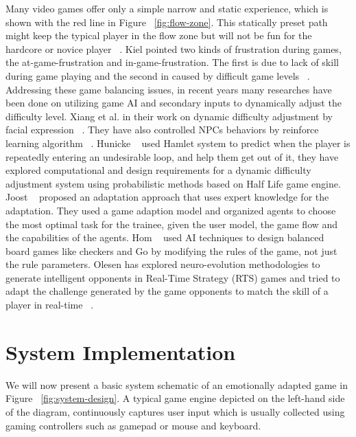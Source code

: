 \documentclass[conference]{IEEEtran}
\begin{document}
Many video games offer only a simple narrow and static experience, which is shown with the red line in Figure ~\ref{fig:flow-zone}. This statically preset path might keep the typical player in the flow zone but will not be fun for the hardcore or novice player ~\cite{chen2007flow}. Kiel pointed two kinds of frustration during games, the at-game-frustration and in-game-frustration. The first is due to lack of skill during game playing and the second in caused by difficult game levels ~\cite{gilleade2004using}. Addressing these game balancing issues, in recent years many researches have been done on utilizing game AI and secondary inputs to dynamically adjust the difficulty level. Xiang et al. in their work on dynamic difficulty adjustment by facial expression ~\cite{xiang2013dynamic}. They have also controlled NPCs behaviors by reinforce learning algorithm ~\cite{spronck2004difficulty, andrade2005challenge}. Hunicke ~\cite{hunicke2004ai} used Hamlet system to predict when the player is repeatedly entering an undesirable loop, and help them get out of it, they have explored computational and design requirements for a dynamic difficulty adjustment system using probabilistic methods based on Half Life game engine. Joost ~\cite{westra2009adaptive} proposed an adaptation approach that uses expert knowledge for the adaptation. They used a game adaption model and organized agents to choose the most optimal task for the trainee, given the user model, the game flow and the capabilities of the agents. Hom ~\cite{hom2007automatic} used AI techniques to design balanced board games like checkers and Go by modifying the rules of the game, not just the rule parameters. Olesen has explored neuro-evolution methodologies to generate intelligent opponents in Real-Time Strategy (RTS) games and tried to adapt the challenge generated by the game opponents to match the skill of a player in real-time ~\cite{olesen2008real}.


\section{System Implementation}
\label{sec:impl}

We will now present a basic system schematic of an emotionally adapted game in Figure ~\ref{fig:system-design}. A typical game engine depicted on the left-hand side of the diagram, continuously captures user input which is usually collected using gaming controllers such as gamepad or mouse and keyboard.
\end{document}
